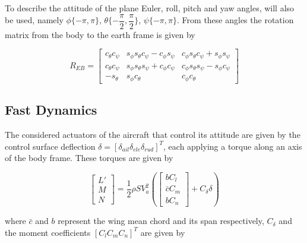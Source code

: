 To describe the attitude of the plane Euler, roll, pitch and yaw angles, will also be used, namely $\phi\{-\pi,\pi\}$, $\theta \{-\dfrac{\pi}{2},\dfrac{\pi}{2}\}$, $\psi \{-\pi,\pi\}$. From these angles the rotation matrix from the body to the earth frame is given by

\begin{equation}
R_{EB}=
\begin{bmatrix}
c_\theta c_\psi & s_\phi s_\theta c_\psi - c_\phi s_\psi & c_\phi s_\theta c_\psi + s_\phi s_\psi \\
c_\theta c_\psi & s_\phi s_\theta s_\psi + c_\phi c_\psi & c_\phi s_\theta s_\psi - s_\phi c_\psi \\
-s_\theta & s_\phi c_\theta & c_\phi c_\theta
\end{bmatrix}
\label{eq:body2earth}
\end{equation}

\subsection{Fast Dynamics}

The considered actuators of the aircraft that control its attitude are given by the control surface deflection $\delta = [\delta_{ail} \delta_{ele} \delta_{rud}]^T$, each applying a torque along an axis of the body frame. These torques are given by

\begin{equation}
\begin{bmatrix}
L'\\
M\\
N
\end{bmatrix}
= \dfrac{1}{2}\rho S V_a^2\left(
\begin{bmatrix}
bC_l\\
\bar{c}C_m\\
bC_n
\end{bmatrix}
+ C_\delta \delta\right)
\label{eq:torque}
\end{equation}

where $\bar{c}$ and $b$ represent the wing mean chord and its span respectively, $C_\delta$ and the moment coefficients $[C_l C_m C_n]^T$ are given by

